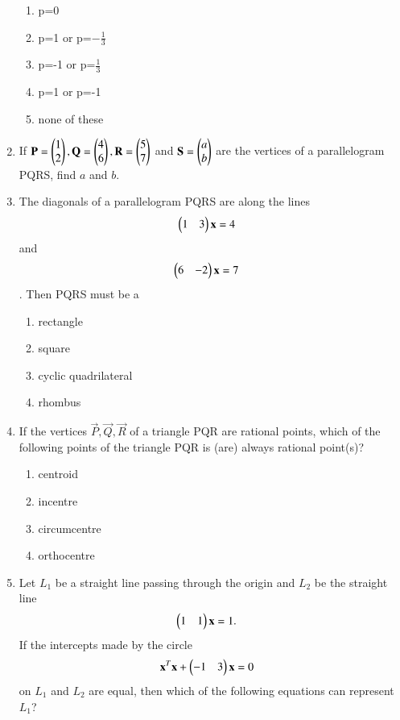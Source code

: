 \begin{enumerate}[label=\arabic*.,ref=\thesubsection.\theenumi]
    \begin{enumerate}
     \item  p=0
     \item  p=1 or p=$-\frac{1}{3}$
     \item  p=-1 or p=$\frac{1}{3}$
     \item  p=1 or p=-1
     \item none of these
     \end{enumerate}
    \item If $\mathbf{P} = \begin{pmatrix}1\\2\end{pmatrix}, \mathbf{Q} = \begin{pmatrix}4\\6\end{pmatrix}, \mathbf{R} = \begin{pmatrix}5\\7\end{pmatrix}$ and $\mathbf{S} = \begin{pmatrix}a\\b\end{pmatrix}$ are the vertices of a parallelogram PQRS, find $a$ and $b$.
    \item The diagonals of a parallelogram PQRS are along the lines \begin{align}\begin{pmatrix}1 & 3\end{pmatrix} \mathbf {x} &= 4\end{align} and \begin{align}\begin{pmatrix}6 & -2\end{pmatrix} \mathbf {x} &= 7\end{align}. Then PQRS must be a
    \begin{enumerate}
     \item  rectangle
     \item  square
     \item  cyclic quadrilateral
     \item  rhombus
     \end{enumerate}
    \item If the vertices $\vec{P}, \vec{Q} , \vec{R}$ of a triangle PQR are rational points, which of the following points of the triangle PQR is (are) always rational point(s)?
    \begin{enumerate}
     \item  centroid
     \item  incentre
     \item  circumcentre
     \item  orthocentre
     \end{enumerate}
    \item Let $L_1$ be a straight line passing through the origin and $L_2$ be the straight line \begin{align}\begin{pmatrix}1 & 1\end{pmatrix} \mathbf {x} &= 1.\end{align} If the intercepts made by the circle  \begin{align}\mathbf{x}^T\mathbf{x} + \begin{pmatrix}-1 & 3\end{pmatrix} \mathbf {x} &= 0\end{align} on $L_1$ and $L_2$ are equal, then which of the following equations can represent $L_1$?

\end{enumerate}
